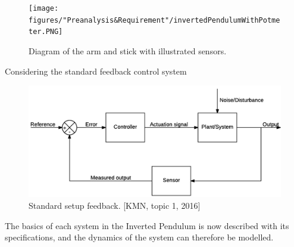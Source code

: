 \begin{figure} [htbp]
	\centering
	\texttt{[image: figures/"Preanalysis\&Requirement"/invertedPendulumWithPotmeter.PNG]}
	\caption{Diagram of the arm and stick with illustrated sensors.} \label{fig:InvertedPendulumSetUpPotmeter}
\end{figure}

Considering the standard feedback control system 

\begin{figure}[htbp]
	\centering
	\includegraphics[width=1\linewidth]{figures/modeling/MechanicalSystem.PNG}
	\caption{Standard setup feedback. [KMN, topic 1, 2016]} \label{fig:BasicFeedbackSystem}
\end{figure}



The basics of each system in the Inverted Pendulum is now described with its specifications, and the dynamics of the system can therefore be modelled.


\newpage
